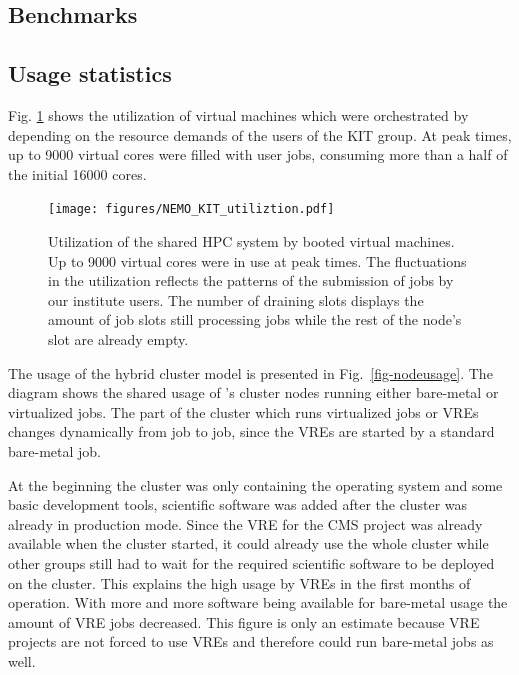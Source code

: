 \subsection{Benchmarks}




%
%
%
\subsection{Usage statistics}
Fig. \ref{fig-frplots} shows the utilization of virtual machines which were orchestrated by \Roced depending on the resource demands of the users of the KIT group.
At peak times, up to 9000 virtual cores were filled with user jobs, consuming more than a half of the initial 16000 \NEMO cores.

\begin{figure}
\begin{center}
  \texttt{[image: figures/NEMO\_KIT\_utiliztion.pdf]}
  \caption{Utilization of the shared HPC system by booted virtual machines. Up to 9000 virtual cores were in use at peak times. The fluctuations in the utilization reflects the patterns of the submission of jobs by our institute users. The number of draining slots displays the amount of job slots still processing jobs while the rest of the node's slot are already empty.}
  \label{fig-frplots}
\end{center}
\end{figure}

The usage of the hybrid cluster model is presented in Fig.~\ref{fig-nodeusage}.
The diagram shows the shared usage of \NEMO's cluster nodes running either
bare-metal or virtualized jobs. The part of the cluster which runs virtualized
jobs or VREs changes dynamically from job to job, since the VREs are started by
a standard bare-metal job.

At the beginning the cluster was only containing the operating system and some
basic development tools, scientific software was added after the cluster was
already in production mode. Since the VRE for the CMS project was already
available when the \NEMO cluster started, it could already use the whole cluster
while other groups still had to wait for the required scientific software to be deployed on
the cluster. This explains the high usage by VREs in the first months of
operation. With more and more software being available for bare-metal usage the
amount of VRE jobs decreased. This figure is only an estimate because VRE
projects are not forced to use VREs and therefore could run bare-metal jobs as
well.

